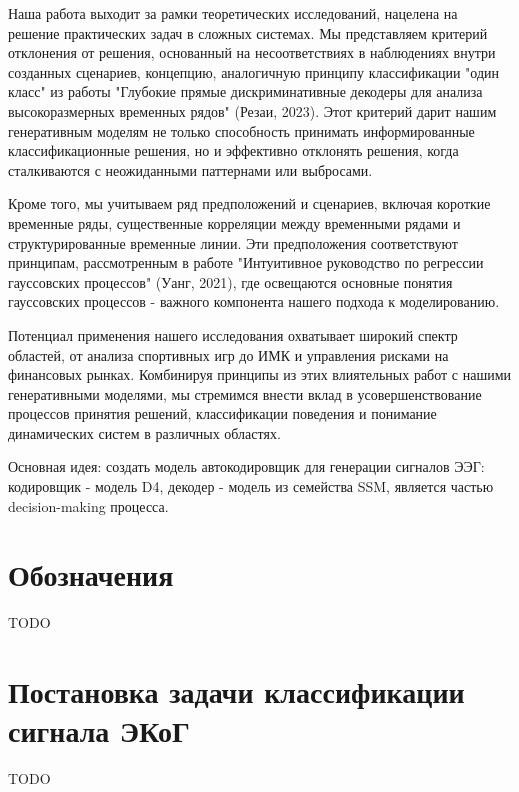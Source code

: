 \documentclass[a4paper, 12pt]{article}
\begin{document}
	Наша работа выходит за рамки теоретических исследований, нацелена на решение практических задач в сложных системах. Мы представляем критерий отклонения от решения, основанный на несоответствиях в наблюдениях внутри созданных сценариев, концепцию, аналогичную принципу классификации "один класс" из работы "Глубокие прямые дискриминативные декодеры для анализа высокоразмерных временных рядов" (Резаи, 2023). Этот критерий дарит нашим генеративным моделям не только способность принимать информированные классификационные решения, но и эффективно отклонять решения, когда сталкиваются с неожиданными паттернами или выбросами.
	
	Кроме того, мы учитываем ряд предположений и сценариев, включая короткие временные ряды, существенные корреляции между временными рядами и структурированные временные линии. Эти предположения соответствуют принципам, рассмотренным в работе "Интуитивное руководство по регрессии гауссовских процессов" (Уанг, 2021), где освещаются основные понятия гауссовских процессов - важного компонента нашего подхода к моделированию.
	
	Потенциал применения нашего исследования охватывает широкий спектр областей, от анализа спортивных игр до ИМК и управления рисками на финансовых рынках. Комбинируя принципы из этих влиятельных работ с нашими генеративными моделями, мы стремимся внести вклад в усовершенствование процессов принятия решений, классификации поведения и понимание динамических систем в различных областях.
	
	Основная идея: создать модель автокодировщик для генерации сигналов ЭЭГ: кодировщик - модель D4, декодер - модель из семейства SSM, является частью decision-making процесса.

\section{Обозначения}

TODO

\section{Постановка задачи классификации сигнала ЭКоГ}
TODO
\end{document}
